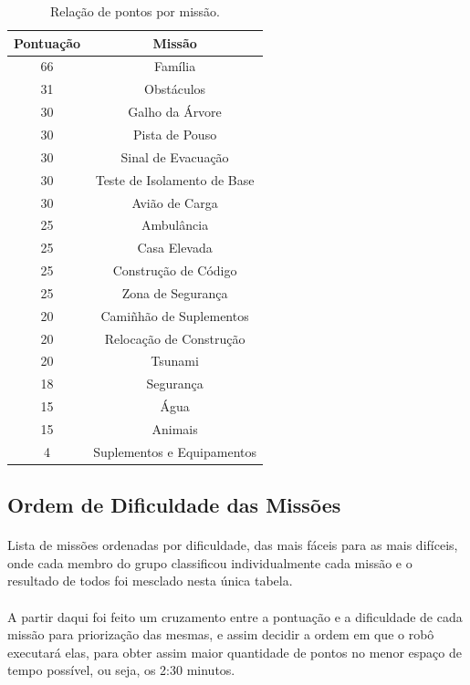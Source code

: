 \documentclass[12pt,a4paper]{article}
\begin{document}
		\begin{table}[h!]
			\begin{center}
				\begin{tabular}{cc}
					\toprule
						Pontuação & Missão\\
					\midrule
						66 & Família\\
						31 & Obstáculos\\
						30 & Galho da Árvore\\
						30 & Pista de Pouso\\
						30 & Sinal de Evacuação\\
						30 & Teste de Isolamento de Base\\
						30 & Avião de Carga\\
						25 & Ambulância\\
						25 & Casa Elevada\\
						25 & Construção de Código\\
						25 & Zona de Segurança\\
						20 & Camiñhão de Suplementos\\
						20 & Relocação de Construção\\
						20 & Tsunami\\
						18 & Segurança\\
						15 & Água\\
						15 & Animais\\
						4 & Suplementos e Equipamentos\\
					\bottomrule
				\end{tabular}
				\caption{Relação de pontos por missão.}
				\label{tab:table_pontuation}
			\end{center}
		\end{table}

	\subsection{Ordem de Dificuldade das Missões}
		\paragraph{}
			Lista de missões ordenadas por dificuldade, das mais fáceis para as 
			mais difíceis, onde cada membro do grupo classificou individualmente 
			cada missão e o resultado de todos foi mesclado nesta única tabela.
		\paragraph{}
			A partir daqui foi feito um cruzamento entre a pontuação e a 
			dificuldade de cada missão para priorização das mesmas, e assim 
			decidir a ordem em que o robô executará elas, para obter assim maior 
			quantidade de pontos no menor espaço de tempo possível, ou seja, os 
			2:30 minutos.
\end{document}
